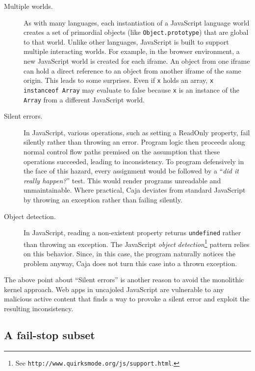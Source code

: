 \documentclass[letterpaper,twocolumn,10pt]{article}
\newcommand{\code}[1]{{\tt {#1}}}              %
\begin{document}
\begin{description}
  \item[Multiple worlds.] As with many languages, each instantiation of a JavaScript language world creates a set of 
  primordial objects (like \code{Object.prototype}) that are global to that world. Unlike other languages, JavaScript 
  is built to support multiple interacting worlds. For example, in the browser environment, a new JavaScript world is 
  created for each iframe. An object from one iframe can hold a direct reference to an object from another iframe of 
  the same origin. This leads to some surprises. Even if \code{x} holds an array, \code{x instanceof Array} may 
  evaluate to false because \code{x} is an instance of the \code{Array} from a different JavaScript world.
  
  \item[Silent errors.] In JavaScript, various operations, such as setting a ReadOnly property, fail silently rather 
  than throwing an error. Program logic then proceeds along normal control flow paths premised on the assumption that 
  these operations succeeded, leading to inconsistency. To program defensively in the face of this hazard, every 
  assignment would be followed by a ``\emph{did it really happen?}'' test. This would render programs unreadable and 
  unmaintainable. Where practical, Caja deviates from standard JavaScript by throwing an exception rather than 
  failing silently.
  
  \item[Object detection.] In JavaScript, reading a non-existent property returns \code{undefined} rather than 
  throwing an exception. The JavaScript \emph{object detection}\footnote{
  See {\tt http://www.quirksmode.org/js/support.html}.
  } pattern relies on this behavior. Since, in this case, 
  the program naturally notices the problem anyway, Caja does not turn this case into a thrown exception.
    
\end{description}

The above point about ``Silent errors'' is another reason to avoid the monolithic kernel approach. Web apps in 
uncajoled JavaScript are vulnerable to any malicious active content that finds a way to provoke a silent error and 
exploit the resulting inconsistency.

\subsection{A fail-stop subset}
\label{subsec:fail-stop}
\end{document}

